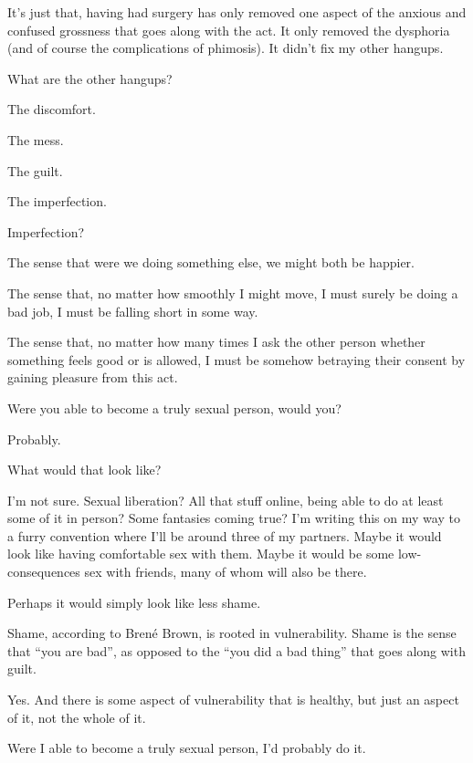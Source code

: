 \begin{paracol}{2}
\begin{leftcolumn}
It's just that, having had surgery has only removed one aspect of the anxious and confused grossness that goes along with the act. It only removed the dysphoria (and of course the complications of phimosis). It didn't fix my other hangups.

\begin{ally}
What are the other hangups?
\end{ally}
The discomfort.

The mess.

The guilt.

The imperfection.

\begin{ally}
Imperfection?
\end{ally}
The sense that were we doing something else, we might both be happier.

The sense that, no matter how smoothly I might move, I must surely be doing a bad job, I must be falling short in some way.

The sense that, no matter how many times I ask the other person whether something feels good or is allowed, I must be somehow betraying their consent by gaining pleasure from this act.
\newpage

\begin{ally}
Were you able to become a truly sexual person, would you?
\end{ally}
Probably.

\begin{ally}
What would that look like?
\end{ally}
I'm not sure. Sexual liberation? All that stuff online, being able to do at least some of it in person? Some fantasies coming true? I'm writing this on my way to a furry convention where I'll be around three of my partners. Maybe it would look like having comfortable sex with them. Maybe it would be some low-consequences sex with friends, many of whom will also be there.

Perhaps it would simply look like less shame.

\begin{ally}
Shame, according to Brené Brown, is rooted in vulnerability. Shame is the sense that ``you are bad'', as opposed to the ``you did a bad thing'' that goes along with guilt.
\end{ally}
Yes. And there is some aspect of vulnerability that is healthy, but just an aspect of it, not the whole of it.

Were I able to become a truly sexual person, I'd probably do it.


\end{leftcolumn}
\end{paracol}

